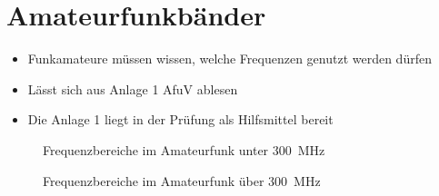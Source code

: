 
\section{Amateurfunkbänder}
\label{section:amateurfunkbaender}
\begin{frame}%
\begin{itemize}
  \item Funkamateure müssen wissen, welche Frequenzen genutzt werden dürfen
  \item Lässt sich aus Anlage 1 AfuV ablesen
  \item Die Anlage 1 liegt in der Prüfung als Hilfsmittel bereit
  \end{itemize}
\end{frame}

\begin{frame}
\begin{figure}
    \caption{\scriptsize Frequenzbereiche im Amateurfunk unter \qty{300}{\mega\hertz}}
    \label{amateuerfunkbaender_2}
\end{figure}

\end{frame}

\begin{frame}
\begin{figure}
    \caption{\scriptsize Frequenzbereiche im Amateurfunk über \qty{300}{\mega\hertz}}
    \label{amateuerfunkbaender_1}
\end{figure}

\end{frame}

\begin{frame}
\end{frame}

